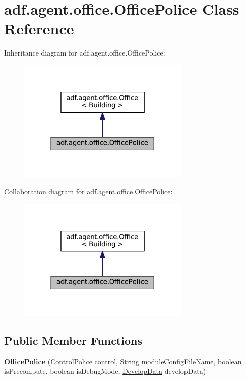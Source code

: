 \hypertarget{classadf_1_1agent_1_1office_1_1OfficePolice}{}\section{adf.\+agent.\+office.\+Office\+Police Class Reference}
\label{classadf_1_1agent_1_1office_1_1OfficePolice}


Inheritance diagram for adf.\+agent.\+office.\+Office\+Police\+:
\nopagebreak
\begin{figure}[H]
\begin{center}
\leavevmode
\includegraphics[width=233pt]{classadf_1_1agent_1_1office_1_1OfficePolice__inherit__graph}
\end{center}
\end{figure}


Collaboration diagram for adf.\+agent.\+office.\+Office\+Police\+:
\nopagebreak
\begin{figure}[H]
\begin{center}
\leavevmode
\includegraphics[width=233pt]{classadf_1_1agent_1_1office_1_1OfficePolice__coll__graph}
\end{center}
\end{figure}
\subsection*{Public Member Functions}
\begin{DoxyCompactItemize}
\item 
\hypertarget{classadf_1_1agent_1_1office_1_1OfficePolice_a7ec353591cc41b38c48f7674d7efdd37}{}\label{classadf_1_1agent_1_1office_1_1OfficePolice_a7ec353591cc41b38c48f7674d7efdd37} 
{\bfseries Office\+Police} (\hyperlink{classadf_1_1component_1_1control_1_1ControlPolice}{Control\+Police} control, String module\+Config\+File\+Name, boolean is\+Precompute, boolean is\+Debug\+Mode, \hyperlink{classadf_1_1agent_1_1develop_1_1DevelopData}{Develop\+Data} develop\+Data)
\end{DoxyCompactItemize}
